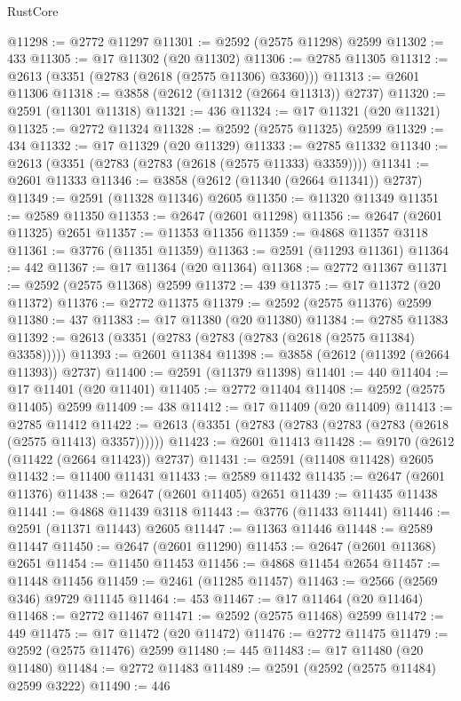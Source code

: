 \begin{lexlean}{RustCore}
\begin{coremodule}
@11298 := @2772 @11297
@11301 := @2592 (@2575 @11298) @2599
@11302 := 433
@11305 := @17 @11302 (@20 @11302)
@11306 := @2785 @11305
@11312 := @2613 (@3351 (@2783 (@2618 (@2575 @11306) @3360)))
@11313 := @2601 @11306
@11318 := @3858 (@2612 (@11312 (@2664 @11313)) @2737)
@11320 := @2591 (@11301 @11318)
@11321 := 436
@11324 := @17 @11321 (@20 @11321)
@11325 := @2772 @11324
@11328 := @2592 (@2575 @11325) @2599
@11329 := 434
@11332 := @17 @11329 (@20 @11329)
@11333 := @2785 @11332
@11340 := @2613 (@3351 (@2783 (@2783 (@2618 (@2575 @11333) @3359))))
@11341 := @2601 @11333
@11346 := @3858 (@2612 (@11340 (@2664 @11341)) @2737)
@11349 := @2591 (@11328 @11346) @2605
@11350 := @11320 @11349
@11351 := @2589 @11350
@11353 := @2647 (@2601 @11298)
@11356 := @2647 (@2601 @11325) @2651
@11357 := @11353 @11356
@11359 := @4868 @11357 @3118
@11361 := @3776 (@11351 @11359)
@11363 := @2591 (@11293 @11361)
@11364 := 442
@11367 := @17 @11364 (@20 @11364)
@11368 := @2772 @11367
@11371 := @2592 (@2575 @11368) @2599
@11372 := 439
@11375 := @17 @11372 (@20 @11372)
@11376 := @2772 @11375
@11379 := @2592 (@2575 @11376) @2599
@11380 := 437
@11383 := @17 @11380 (@20 @11380)
@11384 := @2785 @11383
@11392 := @2613 (@3351 (@2783 (@2783 (@2783 (@2618 (@2575 @11384) @3358)))))
@11393 := @2601 @11384
@11398 := @3858 (@2612 (@11392 (@2664 @11393)) @2737)
@11400 := @2591 (@11379 @11398)
@11401 := 440
@11404 := @17 @11401 (@20 @11401)
@11405 := @2772 @11404
@11408 := @2592 (@2575 @11405) @2599
@11409 := 438
@11412 := @17 @11409 (@20 @11409)
@11413 := @2785 @11412
@11422 := @2613 (@3351 (@2783 (@2783 (@2783 (@2783 (@2618 (@2575 @11413) @3357))))))
@11423 := @2601 @11413
@11428 := @9170 (@2612 (@11422 (@2664 @11423)) @2737)
@11431 := @2591 (@11408 @11428) @2605
@11432 := @11400 @11431
@11433 := @2589 @11432
@11435 := @2647 (@2601 @11376)
@11438 := @2647 (@2601 @11405) @2651
@11439 := @11435 @11438
@11441 := @4868 @11439 @3118
@11443 := @3776 (@11433 @11441)
@11446 := @2591 (@11371 @11443) @2605
@11447 := @11363 @11446
@11448 := @2589 @11447
@11450 := @2647 (@2601 @11290)
@11453 := @2647 (@2601 @11368) @2651
@11454 := @11450 @11453
@11456 := @4868 @11454 @2654
@11457 := @11448 @11456
@11459 := @2461 (@11285 @11457)
@11463 := @2566 (@2569 @346) @9729 @11145
@11464 := 453
@11467 := @17 @11464 (@20 @11464)
@11468 := @2772 @11467
@11471 := @2592 (@2575 @11468) @2599
@11472 := 449
@11475 := @17 @11472 (@20 @11472)
@11476 := @2772 @11475
@11479 := @2592 (@2575 @11476) @2599
@11480 := 445
@11483 := @17 @11480 (@20 @11480)
@11484 := @2772 @11483
@11489 := @2591 (@2592 (@2575 @11484) @2599 @3222)
@11490 := 446

\end{coremodule}
\end{lexlean}
